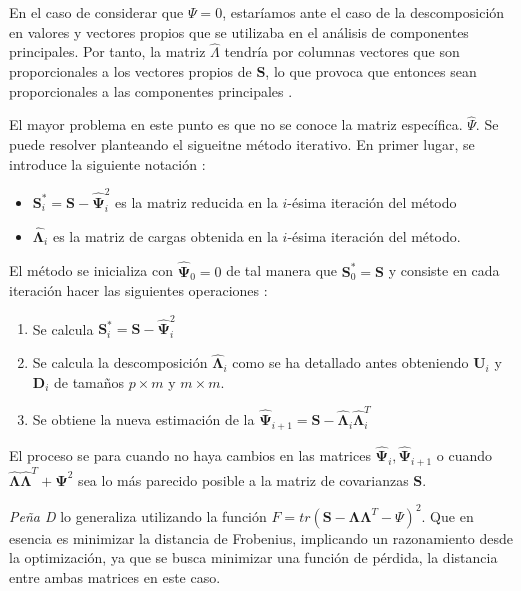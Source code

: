 \noindent En el caso de considerar que $\Psi=0$, estaríamos ante el caso de la descomposición en valores y vectores propios que se utilizaba en el análisis de componentes principales. Por tanto, la matriz $\hat{\Lambda}$ tendría por columnas vectores que son proporcionales a los vectores propios de $\mathbf{S}$, lo que provoca que entonces sean proporcionales a las componentes principales \cite{Rencher 2002}. 

\noindent El mayor problema en este punto es que no se conoce la matriz específica.  $\hat{\Psi}$. Se puede resolver planteando el sigueitne método iterativo. En primer lugar, se introduce la siguiente notación :
\begin{itemize}
\item $\mathbf{S}_i^*=\mathbf{S}-\hat{\mathbf{\Psi}}_i^2$ es la matriz reducida en la $i$-ésima iteración del método
\item $\mathbf{\hat{\Lambda}}_i$ es la matriz de cargas obtenida en la $i$-ésima iteración del método. 
\end{itemize}
\noindent El método se inicializa con $\mathbf{\hat{\Psi}}_0=0$ de tal manera que $\mathbf{S}_0^*=\mathbf{S}$ y consiste en cada iteración hacer las siguientes operaciones \cite{Cuadras 2014, Johnson 2007, Peña 2002}: 
\begin{enumerate}
\item Se calcula $\mathbf{S}_i^*=\mathbf{S-\hat{\Psi}}_i^2$
\item Se calcula la descomposición $\mathbf{\hat{\Lambda}}_i$ como se ha detallado antes obteniendo $\mathbf{U}_i$ y $\mathbf{D}_i$ de tamaños $p\times m $ y $m\times m$. 
\item Se obtiene la nueva estimación de la $\mathbf{\hat{\Psi}}_{i+1}=\mathbf{S}-\mathbf{\hat{\Lambda}}_i\mathbf{\hat{\Lambda}}_i^T$
\end{enumerate}

\noindent El proceso se para cuando no haya cambios en las matrices $\mathbf{\hat{\Psi}}_i,\mathbf{\hat{\Psi}}_{i+1}$ o cuando $\mathbf{\hat{\Lambda}}\mathbf{\hat{\Lambda}}^T+\mathbf{\Psi}^2$ sea lo más parecido posible a la matriz de covarianzas $\mathbf{S}$.

\noindent \emph{Peña D} \cite{Peña 2002} lo generaliza utilizando la función $F=tr(\mathbf{S}-\mathbf{\Lambda}\mathbf{\Lambda}^T-\Psi)^2$. Que en esencia es minimizar la distancia de Frobenius, implicando un razonamiento desde la optimización, ya que se busca minimizar  una función de pérdida, la distancia entre ambas matrices en este caso. 

